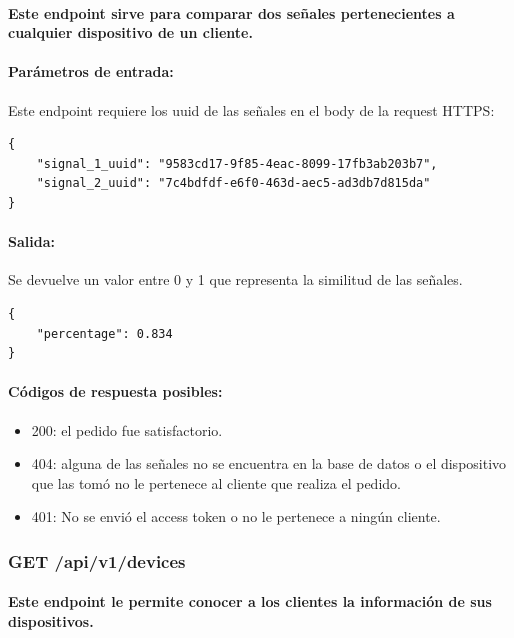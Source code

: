 \documentclass{article}
\begin{document}
\paragraph{
Este endpoint sirve para comparar dos señales pertenecientes a cualquier dispositivo de un cliente.
}

\paragraph{
Parámetros de entrada:}
Este endpoint requiere los uuid de las señales en el body de la request HTTPS:

\begin{verbatim}
{
    "signal_1_uuid": "9583cd17-9f85-4eac-8099-17fb3ab203b7",
    "signal_2_uuid": "7c4bdfdf-e6f0-463d-aec5-ad3db7d815da"
}

\end{verbatim}

\paragraph{
Salida:}
Se devuelve un valor entre 0 y 1 que representa la similitud de las señales.

\begin{verbatim}
{
    "percentage": 0.834
}
\end{verbatim}

\paragraph{
Códigos de respuesta posibles:
}
\begin{itemize}
    \item 200: el pedido fue satisfactorio.
    \item 404: alguna de las señales no se encuentra en la base de datos o el dispositivo que las tomó no le pertenece al cliente que realiza el pedido.
    \item 401: No se envió el access token o no le pertenece a ningún cliente.
\end{itemize}

\subsubsection{GET /api/v1/devices}
\paragraph{
Este endpoint le permite conocer a los clientes la información de sus dispositivos.
}
\end{document}
